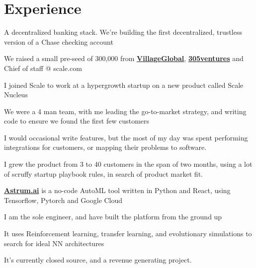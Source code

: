 \documentclass[]{deedy-resume-openfont}
\begin{document}
\begin{minipage}[t]{0.66\textwidth} 


\section{Experience}

\vspace{\topsep} %
\begin{tightemize}
\item A decentralized banking stack. We're building the first decentralized, trustless version of a Chase checking account
\item We raised a small pre-seed of 300,000 from \href{www.villageglobal.vc}{\textbf{VillageGlobal}}, \href{305Ventures.com}{\textbf{305ventures}} and Chief of staff @ scale.com
\end{tightemize}
\sectionsep

\vspace{\topsep} %
\begin{tightemize}
\item I joined Scale to work at a hypergrowth startup on a new product called Scale Nucleus
\item We were a 4 man team, with me leading the go-to-market strategy, and writing code to ensure we found the first few customers
\item I would occasional write features, but the most of my day was spent performing integrations for customers, or mapping their problems to software.
\item I grew the product from 3 to 40 customers in the span of two months, using a lot of scruffy startup playbook rules, in search of product market fit.
\end{tightemize}
\sectionsep

\vspace{\topsep} %
\begin{tightemize}
\item \textbf{\href{https://www.astrum.ai}{Astrum.ai}} is a no-code AutoML tool written in Python and React, using Tensorflow, Pytorch and Google Cloud
\item I am the sole engineer, and have built the platform from the ground up
\item It uses Reinforcement learning, transfer learning, and evolutionary simulations to search for ideal NN architectures
\item It's currently closed source, and a revenue generating project.
\end{tightemize}
\sectionsep


\end{minipage}
\end{document}
